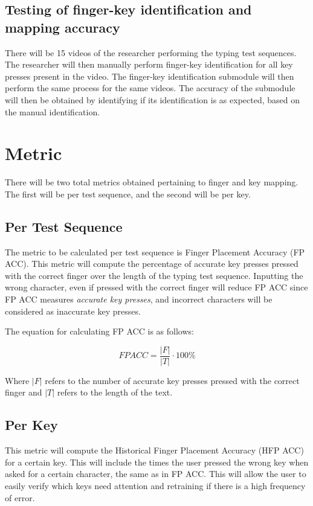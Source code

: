 \documentclass{report}
\begin{document}
\subsection{Testing of finger-key identification and mapping accuracy}

There will be 15 videos of the researcher performing the typing test sequences.
The researcher will then manually perform finger-key identification for all key
presses present in the video. The finger-key identification submodule will then
perform the same process for the same videos. The accuracy of the submodule will
then be obtained by identifying if its identification is as expected, based on
the manual identification.

\section{Metric}
\label{section:metric}

There will be two total metrics obtained pertaining to finger and key mapping.
The first will be per test sequence, and the second will be per key.

\subsection{Per Test Sequence}
The metric to be calculated per test sequence is Finger Placement Accuracy (FP
ACC). This metric will compute the percentage of accurate key presses pressed
with the correct finger over the length of the typing test sequence. Inputting
the wrong character, even if pressed with the correct finger will reduce FP ACC
since FP ACC measures \emph{accurate key presses}, and incorrect characters will
be considered as inaccurate key presses.

The equation for calculating FP ACC is as follows:

\begin{equation}
	FP ACC = \frac{|F|}{|T|} \cdot 100\%
\end{equation}

Where $|F|$ refers to the number of accurate key presses pressed with the
correct finger and $|T|$ refers to the length of the text.

\subsection{Per Key}
This metric will compute the Historical Finger Placement Accuracy (HFP ACC) for
a certain key. This will include the times the user pressed the wrong key when
asked for a certain character, the same as in FP ACC. This will allow the user
to easily verify which keys need attention and retraining if there is a high
frequency of error.
\end{document}

